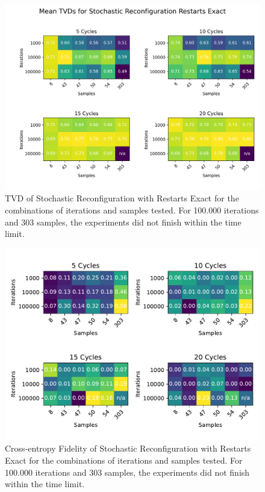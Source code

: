\begin{figure}[H]
  \centering
  \includegraphics[width=\textwidth]{figures/results/SR-restarts-not-learned/tvd_heatmap.png}
  \caption[TVD of Stochastic Reconfiguration with Restarts Exact]{TVD of Stochastic 
  Reconfiguration with Restarts Exact for the combinations of iterations and samples tested.
  For 100.000 iterations and 303 samples, the experiments did not finish within the time limit.}
  \label{fig:sr_tvd}
\end{figure}

\begin{figure}[H]
  \centering
  \includegraphics[width=\textwidth]{figures/results/SR-restarts-not-learned/fxeb_heatmap.pdf}
  \caption[Cross-entropy Fidelity of Stochastic Reconfiguration with Restarts Exact]{Cross-entropy Fidelity of Stochastic 
  Reconfiguration with Restarts Exact for the combinations of iterations and samples tested.
  For 100.000 iterations and 303 samples, the experiments did not finish within the time limit.}
  \label{fig:sr_tvd}
\end{figure}


